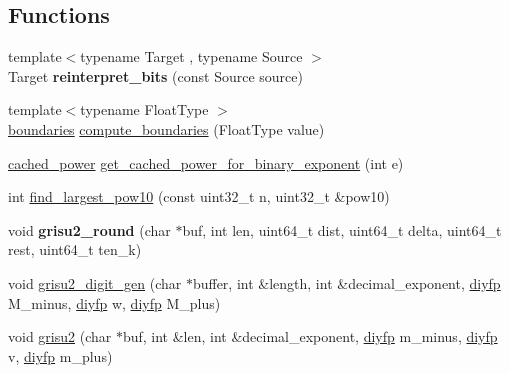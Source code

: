\subsection*{Functions}
\begin{DoxyCompactItemize}
\item 
\mbox{\label{namespacenlohmann_1_1detail_1_1dtoa__impl_a1c5d30eb51e5e994a3f48bde104d2ce8}} 
{\footnotesize template$<$typename Target , typename Source $>$ }\\Target {\bfseries reinterpret\+\_\+bits} (const Source source)
\item 
{\footnotesize template$<$typename Float\+Type $>$ }\\\hyperlink{structnlohmann_1_1detail_1_1dtoa__impl_1_1boundaries}{boundaries} \hyperlink{namespacenlohmann_1_1detail_1_1dtoa__impl_a22b6e37654ac93c6d0d9c06ec1bf5ded}{compute\+\_\+boundaries} (Float\+Type value)
\item 
\hyperlink{structnlohmann_1_1detail_1_1dtoa__impl_1_1cached__power}{cached\+\_\+power} \hyperlink{namespacenlohmann_1_1detail_1_1dtoa__impl_adbf329a18c5cf854a3477327afd2200b}{get\+\_\+cached\+\_\+power\+\_\+for\+\_\+binary\+\_\+exponent} (int e)
\item 
int \hyperlink{namespacenlohmann_1_1detail_1_1dtoa__impl_a264df2b5a7e19b864859161f3501155e}{find\+\_\+largest\+\_\+pow10} (const uint32\+\_\+t n, uint32\+\_\+t \&pow10)
\item 
\mbox{\label{namespacenlohmann_1_1detail_1_1dtoa__impl_a9e66e6d0f072aa4fc0627bffc5b1cbd8}} 
void {\bfseries grisu2\+\_\+round} (char $\ast$buf, int len, uint64\+\_\+t dist, uint64\+\_\+t delta, uint64\+\_\+t rest, uint64\+\_\+t ten\+\_\+k)
\item 
void \hyperlink{namespacenlohmann_1_1detail_1_1dtoa__impl_a9b899c72b0e1e3dd46d75c2b4e6bcdfb}{grisu2\+\_\+digit\+\_\+gen} (char $\ast$buffer, int \&length, int \&decimal\+\_\+exponent, \hyperlink{structnlohmann_1_1detail_1_1dtoa__impl_1_1diyfp}{diyfp} M\+\_\+minus, \hyperlink{structnlohmann_1_1detail_1_1dtoa__impl_1_1diyfp}{diyfp} w, \hyperlink{structnlohmann_1_1detail_1_1dtoa__impl_1_1diyfp}{diyfp} M\+\_\+plus)
\item 
void \hyperlink{namespacenlohmann_1_1detail_1_1dtoa__impl_a05b681dcb8569b9784c6dccfadb01633}{grisu2} (char $\ast$buf, int \&len, int \&decimal\+\_\+exponent, \hyperlink{structnlohmann_1_1detail_1_1dtoa__impl_1_1diyfp}{diyfp} m\+\_\+minus, \hyperlink{structnlohmann_1_1detail_1_1dtoa__impl_1_1diyfp}{diyfp} v, \hyperlink{structnlohmann_1_1detail_1_1dtoa__impl_1_1diyfp}{diyfp} m\+\_\+plus)

\end{DoxyCompactItemize}
